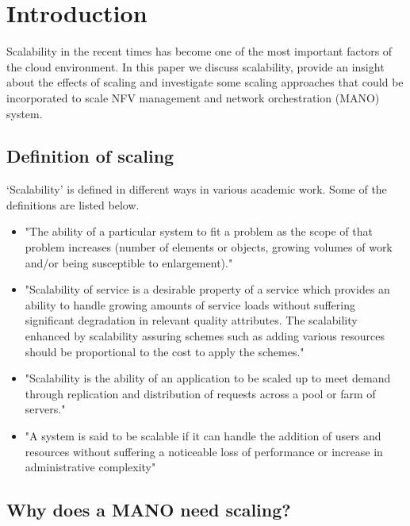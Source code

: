 \chapter{Introduction}
\label{ch:Introduction}

Scalability in the recent times has become one of the most important factors of the cloud environment. In this paper we discuss scalability, provide an insight about the effects of scaling and investigate some scaling approaches that could be incorporated to scale NFV management and network orchestration (MANO) system.

\section{Definition of scaling}
`Scalability' is defined in different ways in various academic work. Some of the definitions are listed below.
\begin{itemize}	 

\item "The ability of a particular system to fit a problem as the scope of that problem increases (number of elements or objects, growing volumes of work and/or being susceptible to enlargement)." \cite{furht_handbook_2010}

\item "Scalability of service is a desirable property of a service which provides an ability to handle growing amounts of service loads without suffering significant degradation in relevant quality attributes. The scalability enhanced by scalability assuring schemes such as adding various resources should be proportional to the cost to apply the schemes." \cite{lee_software_2010}

\item "Scalability is the ability of an application to be scaled up to meet demand through replication and distribution of requests across a pool or farm of servers." \cite{chieu_scalability_2011}

\item "A system is said to be scalable if it can handle the addition of users and resources without suffering a noticeable loss of performance or increase in administrative complexity" \cite{noauthor_scale_nodate}

\end{itemize}

\section{Why does a MANO need scaling?}
